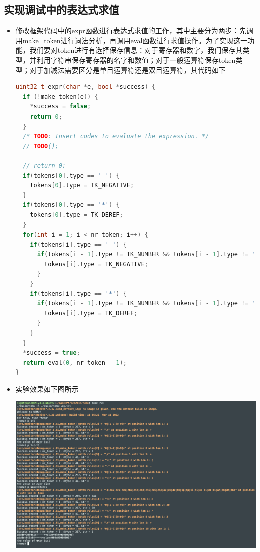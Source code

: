 \documentclass[UTF8,a4paper,10pt]{ctexart}
\begin{document}
\subsection{实现调试中的表达式求值}
\begin{itemize}
  \item 修改框架代码中的expr函数进行表达式求值的工作，其中主要分为两步：先调用make\_token进行词法分析，再调用eval函数进行求值操作。为了实现这一功能，我们要对token进行有选择保存信息：对于寄存器和数字，我们保存其类型，并利用字符串保存寄存器的名字和数值；对于一般运算符保存token类型；对于加减法需要区分是单目运算符还是双目运算符，其代码如下
  \begin{lstlisting}[language = c]
uint32_t expr(char *e, bool *success) {
  if (!make_token(e)) {
    *success = false;
    return 0;
  }
  /* TODO: Insert codes to evaluate the expression. */
  // TODO();

  // return 0;
  if(tokens[0].type == '-') {
    tokens[0].type = TK_NEGATIVE;
  }
  if(tokens[0].type == '*') {
    tokens[0].type = TK_DEREF;
  }
  for(int i = 1; i < nr_token; i++) {
    if(tokens[i].type == '-') {
      if(tokens[i - 1].type != TK_NUMBER && tokens[i - 1].type != ')') {
        tokens[i].type = TK_NEGATIVE;
      }
    }
    if(tokens[i].type == '*') {
      if(tokens[i - 1].type != TK_NUMBER && tokens[i - 1].type != ')') {
        tokens[i].type = TK_DEREF;
      }
    }
  }
  *success = true;
  return eval(0, nr_token - 1);
}
  \end{lstlisting}
  \item 实验效果如下图所示
  \begin{center}
    \includegraphics[scale = 0.3]{6}
  \end{center}
\end{itemize}
\end{document}
